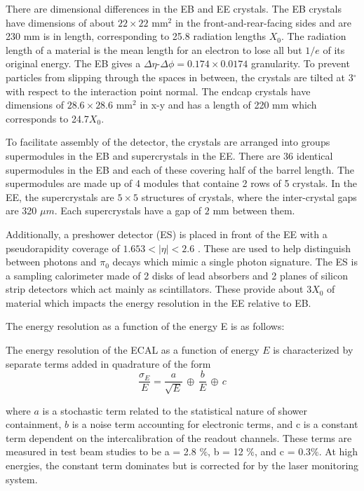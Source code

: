 There are dimensional differences in the EB and EE crystals. The EB crystals have dimensions of about $22\times22$ mm$^2$ in the front-and-rear-facing sides and are 230 mm is in length, corresponding to 25.8 radiation lengths $X_{0}$. The radiation length of a material is the mean length for an electron to lose all but $1/e$ of its original energy. The EB gives a $\Delta \eta$-$\Delta \phi = 0.174\times0.0174$ granularity. To prevent particles from slipping through the spaces in between, the crystals are tilted at 3$^{\circ}$ with respect to the interaction point normal. The endcap crystals have dimensions of $28.6\times28.6$ mm$^2$ in x-y and has a length of 220 mm which corresponds to 24.7$X_0$. 

To facilitate assembly of the detector, the crystals are arranged into groups supermodules in the EB and supercrystals in the EE. There are 36 identical supermodules in the EB and each of these covering half of the barrel length. The supermodules are made up of 4 modules that containe 2 rows of 5 crystals. In the EE, the supercrystals are $5\times5$ structures of crystals, where the inter-crystal gaps are 320 $\mu m$. Each supercrystals have a gap of $2$ mm between them.

Additionally, a preshower detector (ES) is placed in front of the EE with a pseudorapidity coverage of $1.653 < |\eta| < 2.6$ . These are used to help distinguish between photons and $\pi_{0}$ decays which mimic a single photon signature. The ES is a sampling calorimeter made of 2 disks of lead absorbers and 2 planes of silicon strip detectors which act mainly as scintillators. These provide about 3$X_{0}$ of material which impacts the energy resolution in the EE relative to EB. 

The energy resolution as a function of the energy E is as follows:

The energy resolution of the ECAL as a function of energy $E$ is characterized by separate terms added in quadrature of the form
\begin{equation}\label{eq:ECALEnergyRes}
	\frac{\sigma_E}{E} = \frac{a}{\sqrt{E}}\,\oplus\,\frac{b}{E}\,\oplus\,c
 \label{eq:energyresolution}
\end{equation}

where $a$ is a stochastic term related to the statistical nature of shower containment, $b$ is a noise term accounting for electronic terms, and c is a constant term dependent on the intercalibration of the readout channels. These terms are measured in test beam studies to be a = 2.8 $\%$, b = 12 $\%$, and c = 0.3$\%$. At high energies, the constant term dominates but is corrected for by the laser monitoring system. 

